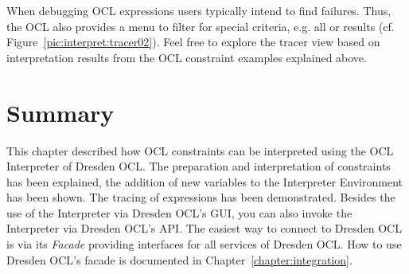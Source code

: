 When debugging OCL expressions users typically intend to find failures. Thus,
the OCL  also provides a menu to filter for special
criteria, e.g. all  or  results (cf.
Figure~\ref{pic:interpret:tracer02}). Feel free to explore the tracer view
based on interpretation results from the OCL constraint examples explained
above.


\section{Summary}
  
This chapter described how OCL constraints can be interpreted using the OCL
Interpreter of Dresden OCL. The preparation and interpretation of constraints
has been explained, the addition of new variables to the Interpreter
Environment has been shown. The tracing of expressions has been demonstrated.
Besides the use of the Interpreter via Dresden OCL's GUI, you can also invoke
the Interpreter via Dresden OCL's \acs{API}. The easiest way to connect to
Dresden OCL is via its \emph{Facade} providing interfaces for all services of
Dresden OCL. How to use Dresden OCL's facade is documented in
Chapter~\ref{chapter:integration}.
